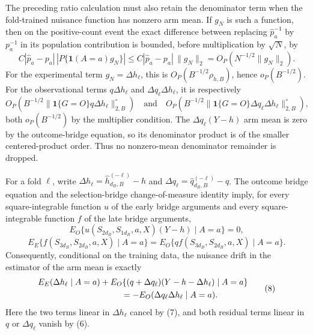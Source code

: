 The preceding ratio calculation must also retain the denominator term when the fold-trained nuisance function has nonzero arm mean.  If \(g_N\) is such a function, then on the positive-count event the exact difference between replacing \(\widehat p_a^{-1}\) by \(p_a^{-1}\) in its population contribution is bounded, before multiplication by \(\sqrt N\), by
\[
 C|\widehat p_a-p_a|\,|P\{\mathbf 1(A=a)g_N\}|
 \le C|\widehat p_a-p_a|\,\|g_N\|_2
 =O_P(N^{-1/2}\|g_N\|_2). \tag{5a}
\]
For the experimental term \(g_N=\Delta h_\ell\), this is \(O_P(B^{-1/2}\rho_{h,B})\), hence \(o_P(B^{-1/2})\).  For the observational terms \(q\Delta h_\ell\) and \(\Delta q_\ell\Delta h_\ell\), it is respectively
\[
 O_P\!\left(B^{-1/2}\|\mathbf1\{G=O\}q\Delta h_\ell\|_{2,B}^{\circ}\right)
 \quad\text{and}\quad
 O_P\!\left(B^{-1/2}\|\mathbf1\{G=O\}\Delta q_\ell\Delta h_\ell\|_{2,B}^{\circ}\right), \tag{5b}
\]
both \(o_P(B^{-1/2})\) by the multiplier condition.  The \(\Delta q_\ell(Y-h)\) arm mean is zero by the outcome-bridge equation, so its denominator product is of the smaller centered-product order.  Thus no nonzero-mean denominator remainder is dropped.

For a fold \(\ell\), write \(\Delta h_\ell=\widehat h_{d_B,B}^{(-\ell)}-h\) and \(\Delta q_\ell=\widehat q_{d_B,B}^{(-\ell)}-q\).  The outcome bridge equation and the selection-bridge change-of-measure identity imply, for every square-integrable function \(u\) of the early bridge arguments and every square-integrable function \(f\) of the late bridge arguments,
\[
 E_O\{u(S_{2d_B},S_{1d_B},a,X)(Y-h)\mid A=a\}=0, \tag{6}
\]
\[
 E_E\{f(S_{3d_B},S_{2d_B},a,X)\mid A=a\}
 =E_O\{q f(S_{3d_B},S_{2d_B},a,X)\mid A=a\}. \tag{7}
\]
Consequently, conditional on the training data, the nuisance drift in the estimator of the arm mean is exactly
\[
\begin{aligned}
 &E_E(\Delta h_\ell\mid A=a)
 +E_O\{(q+\Delta q_\ell)(Y-h-\Delta h_\ell)\mid A=a\}\\
 &\hspace{35mm}=-E_O(\Delta q_\ell\Delta h_\ell\mid A=a).
\end{aligned} \tag{8}
\]
Here the two terms linear in \(\Delta h_\ell\) cancel by (7), and both residual terms linear in \(q\) or \(\Delta q_\ell\) vanish by (6).

